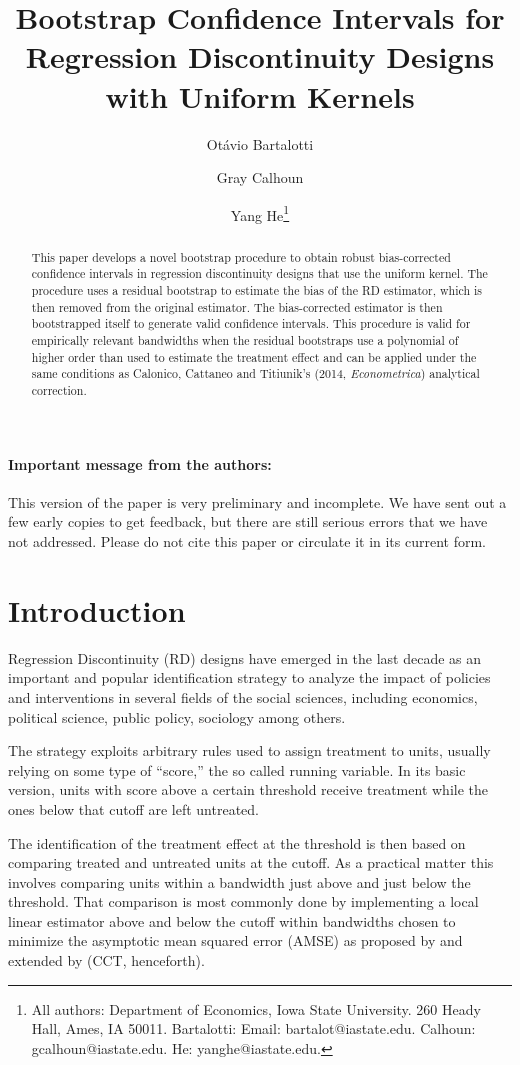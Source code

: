 \documentclass[12pt,fleqn]{article}
\title{Bootstrap Confidence Intervals for Regression Discontinuity Designs with Uniform Kernels}
\author{Ot\'avio Bartalotti \and Gray Calhoun \and Yang He\thanks{All authors: 
Department of Economics, Iowa State University. 260 Heady Hall, Ames, IA  50011.
Bartalotti: Email: bartalot@iastate.edu. Calhoun: gcalhoun@iastate.edu.
He: yanghe@iastate.edu.}}
\begin{document}
\maketitle

\begin{abstract}\noindent
  This paper develops a novel bootstrap procedure to obtain robust
  bias-corrected confidence intervals in regression discontinuity designs that
  use the uniform kernel. The procedure uses a residual bootstrap to estimate
  the bias of the RD estimator, which is then removed from the original estimator.
 The bias-corrected estimator is then bootstrapped itself to
  generate valid confidence intervals. This procedure is valid for empirically
  relevant bandwidths when the residual bootstraps use a polynomial of higher
  order than used to estimate the treatment effect and can be applied under the
  same conditions as Calonico, Cattaneo and Titiunik's (2014,
  \textit{Econometrica}) analytical correction.
\end{abstract}

\paragraph{Important message from the authors:} This version of the paper is
very preliminary and incomplete. We have sent out a few early copies to get
feedback, but there are still serious errors that we have not addressed. Please
do not cite this paper or circulate it in its current form.

\newpage
\section{Introduction}
Regression Discontinuity (RD) designs have emerged in the last decade as an 
important and popular identification strategy to analyze the impact of policies
and interventions in several fields of the social sciences, including economics,
political science, public policy, sociology among others.

The strategy exploits arbitrary rules used to assign treatment to units, usually
relying on some type of ``score,'' the so called running variable. In its basic 
version, units with score above a certain threshold receive treatment while the 
ones below that cutoff are left untreated.

The identification of the treatment effect at the threshold is then based on 
comparing treated and untreated units at the cutoff. As a practical matter this 
involves comparing units within a bandwidth just above and just below the 
threshold. That comparison is most commonly done by implementing a local linear
estimator above and below the cutoff within bandwidths chosen to minimize the 
asymptotic mean squared error (AMSE) as proposed by \cite{IK}
and extended by \cite{calonico2014} (CCT, henceforth).
\end{document}
